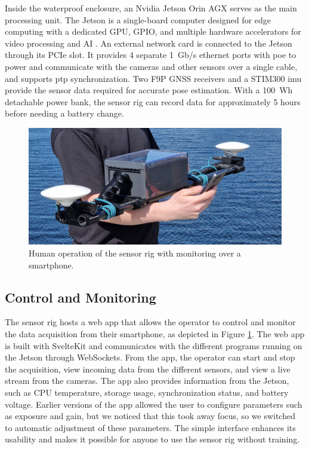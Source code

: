 Inside the waterproof enclosure, an Nvidia Jetson Orin AGX serves as the main processing unit.
The Jetson is a single-board computer designed for edge computing with a dedicated GPU, GPIO, and multiple hardware accelerators for video processing and AI \cite{karumbunathanNVIDIAJetsonAGX2022}.
An external network card is connected to the Jetson through its PCIe slot. 
It provides 4 separate \SI{1}{Gb/s} ethernet ports with \gls{poe} to power and communicate with the cameras and other sensors over a single cable, and supports \gls{ptp} synchronization.
Two F9P GNSS receivers and a STIM300 \gls{imu} provide the sensor data required for accurate pose estimation.
With a \SI{100}{Wh} detachable power bank, the sensor rig can record data for approximately 5 hours before needing a battery change.

\begin{figure}[H]
    
    \centering
    \includegraphics[trim={0 2cm 0 1cm},clip,width=\textwidth]{figures/operation.jpg}
    \caption{Human operation of the sensor rig with monitoring over a smartphone. \label{fig:operation}}
\end{figure}

\subsection{Control and Monitoring}
The sensor rig hosts a web app that allows the operator to control and monitor the data acquisition from their smartphone, as depicted in Figure \ref{fig:operation}.
The web app is built with SvelteKit and communicates with the different programs running on the Jetson through WebSockets.
From the app, the operator can start and stop the acquisition, view incoming data from the different sensors, and view a live stream from the cameras.
The app also provides information from the Jetson, such as CPU temperature, storage usage, synchronization status, and battery voltage.
Earlier versions of the app allowed the user to configure parameters such as exposure and gain, but we noticed that this took away focus, so we switched to automatic adjustment of these parameters.
The simple interface enhances its usability and makes it possible for anyone to use the sensor rig without training.

